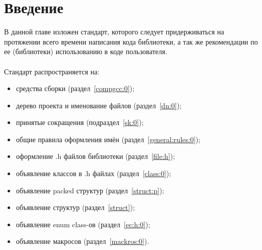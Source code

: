 \section{Введение}
В данной главе изложен стандарт, которого следует придерживаться на протяжении всего времени написания кода библиотеки, а так же рекомендации по ее (библиотеки) использованию в коде пользователя.\\\\
Стандарт распространяется на:
\begin{itemize}
	\item средства сборки (раздел~\ref{compgcc:0});
	\item дерево проекта и именование файлов (раздел~\ref{dn:0});
	\item принятые сокращения (подраздел~\ref{sk:0});
	\item общие правила оформления имён (раздел~\ref{general:rules:0});
	\item оформление .h файлов библиотеки (раздел~\ref{file:h});
	\item объявление классов в .h файлах (раздел~\ref{class:0});
	\item объявление packed структур (раздел~\ref{struct:p});
	\item объявление структур (раздел~\ref{struct});
	\item объявление enum class-ов (раздел~\ref{ec:h:0});
	\item объявление макросов (раздел~\ref{mackros:0}).
\end{itemize}
